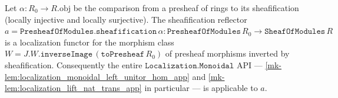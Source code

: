 \begin{lemma}
  \label{mk-lem:presheaf_sheafification_is_localization}
  \mathlibok

  Let \(\alpha : R_0 \to R.\mathrm{obj}\) be the comparison from a presheaf of rings to its
  sheafification (locally injective and locally surjective). The sheafification reflector
  \(a = \mathtt{PresheafOfModules.sheafification}\,\alpha : \mathtt{PresheafOfModules}\,R_0 \to
  \mathtt{SheafOfModules}\,R\) is a localization functor for the morphism class
  \(W = J.W.\mathtt{inverseImage}\,(\mathtt{toPresheaf}\,R_0)\) of presheaf morphisms inverted by
  sheafification. Consequently the entire \(\mathtt{Localization.Monoidal}\) API ---
  \ref{mk-lem:localization_monoidal_left_unitor_hom_app} and
  \ref{mk-lem:localization_lift_nat_trans_app} in particular --- is applicable to \(a\).
\end{lemma}

